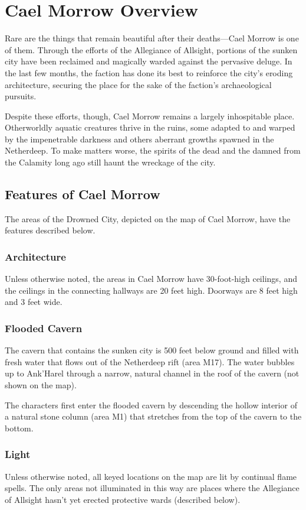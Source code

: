 \documentclass[10pt,a4paper,twoside,twocolumn,openany,nodeprecatedcode]{dndbook}
\begin{document}
\section{Cael Morrow Overview}
Rare are the things that remain beautiful after their deaths—Cael Morrow is one of them. Through the efforts of the Allegiance of Allsight, portions of the sunken city have been reclaimed and magically warded against the pervasive deluge. In the last few months, the faction has done its best to reinforce the city's eroding architecture, securing the place for the sake of the faction's archaeological pursuits.

Despite these efforts, though, Cael Morrow remains a largely inhospitable place. Otherworldly aquatic creatures thrive in the ruins, some adapted to and warped by the impenetrable darkness and others aberrant growths spawned in the Netherdeep. To make matters worse, the spirits of the dead and the damned from the Calamity long ago still haunt the wreckage of the city.

\subsection{Features of Cael Morrow}
The areas of the Drowned City, depicted on the map of Cael Morrow, have the features described below.

\subsubsection{Architecture}
Unless otherwise noted, the areas in Cael Morrow have 30-foot-high ceilings, and the ceilings in the connecting hallways are 20 feet high. Doorways are 8 feet high and 3 feet wide.

\subsubsection{Flooded Cavern}
The cavern that contains the sunken city is 500 feet below ground and filled with fresh water that flows out of the Netherdeep rift (area M17). The water bubbles up to Ank'Harel through a narrow, natural channel in the roof of the cavern (not shown on the map).

The characters first enter the flooded cavern by descending the hollow interior of a natural stone column (area M1) that stretches from the top of the cavern to the bottom.

\subsubsection{Light}
Unless otherwise noted, all keyed locations on the map are lit by continual flame spells. The only areas not illuminated in this way are places where the Allegiance of Allsight hasn't yet erected protective wards (described below).
\end{document}
